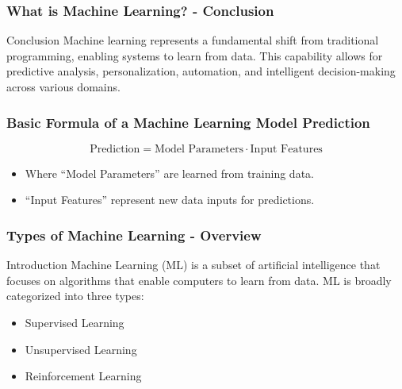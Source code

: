 \documentclass{beamer}
\begin{document}
\begin{frame}[fragile]
    \frametitle{What is Machine Learning? - Conclusion}
    \begin{block}{Conclusion}
        Machine learning represents a fundamental shift from traditional programming, enabling systems to learn from data.
        This capability allows for predictive analysis, personalization, automation, and intelligent decision-making across various domains.
    \end{block}
\end{frame}

\begin{frame}[fragile]
    \frametitle{Basic Formula of a Machine Learning Model Prediction}
    \begin{equation}
        \text{Prediction} = \text{Model Parameters} \cdot \text{Input Features}
    \end{equation}
    \begin{itemize}
        \item Where “Model Parameters” are learned from training data.
        \item “Input Features” represent new data inputs for predictions.
    \end{itemize}
\end{frame}

\begin{frame}[fragile]
    \frametitle{Types of Machine Learning - Overview}
    \begin{block}{Introduction}
        Machine Learning (ML) is a subset of artificial intelligence that focuses on algorithms that enable computers to learn from data. 
        ML is broadly categorized into three types:
        \begin{itemize}
            \item Supervised Learning
            \item Unsupervised Learning
            \item Reinforcement Learning
        \end{itemize}
    \end{block}
\end{frame}
\end{document}
